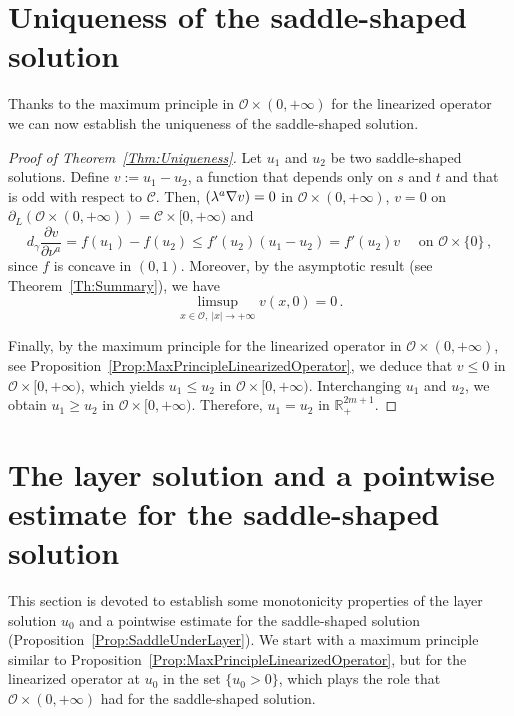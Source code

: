 \documentclass[twoside,leqno,symbols-for-thanks, draft]{rmi}
\numberwithin{equation}{section}
\theoremstyle{definition}
\newcommand{\con}[1]{\mathbb{#1}}
\newcommand{\R}{\con{R}} %
\newcommand{\ccal}{\mathscr{C}}
\newcommand{\ocal}{\mathcal{O}}
\newcommand{\s}{\gamma}
\let\div\relax
\DeclareMathOperator{\div}{div}
\begin{document}
\section{Uniqueness of the saddle-shaped solution}
\label{Sec:Uniqueness}
Thanks to the maximum principle in $\ocal\times (0,+\infty)$ for the linearized operator we can now establish the uniqueness of the saddle-shaped solution.

\begin{proof}[Proof of Theorem~\ref{Thm:Uniqueness}]
	Let $u_1$ and $u_2$ be two saddle-shaped solutions. Define $v := u_1 - u_2$, a function that depends only on $s$ and $t$ and that is odd with respect to $\ccal$. Then, $\div(\lambda^a \nabla v) = 0$ in $\ocal \times (0,+\infty)$, $v=0$ on $\partial_L \left( \ocal \times (0,+\infty) \right) = \ccal \times [0,+\infty)$ and
	$$
	d_\s \dfrac{\partial v}{\partial \nu^a} = f(u_1) - f(u_2) \leq f'(u_2) (u_1 - u_2) = f'(u_2) v \quad \textrm{ on } \ocal \times \{0\}\,,
	$$
	since $f$ is concave in $(0,1)$. Moreover, by the asymptotic result (see Theorem~\ref{Th:Summary}), we have
	$$
	\limsup_{x \in \ocal,\ |x|\to +\infty} v(x, 0) = 0\,.
	$$
	
	Finally, by the maximum principle for the linearized operator in $\ocal\times (0,+\infty)$, see Proposition~\ref{Prop:MaxPrincipleLinearizedOperator}, we deduce that $v \leq 0$ in $\ocal \times [0, +\infty)$, which yields $u_1 \leq u_2$ in $\ocal \times [0, +\infty)$. Interchanging $u_1$ and $u_2$, we obtain $u_1 \geq u_2$ in $\ocal \times [0, +\infty)$. Therefore, $u_1 = u_2$ in $\R^{2m+1}_+$.
\end{proof}


\section{The layer solution and a pointwise estimate for the saddle-shaped solution}
\label{Sec:Layer}

This section is devoted to establish some monotonicity properties of the layer solution $u_0$ and a pointwise estimate for the saddle-shaped solution (Proposition~\ref{Prop:SaddleUnderLayer}). We start with a maximum principle similar to Proposition~\ref{Prop:MaxPrincipleLinearizedOperator}, but for the linearized operator at $u_0$ in the set $\{u_0 > 0\}$, which plays the role that $\ocal\times(0,+\infty)$ had for the saddle-shaped solution.
\end{document}
